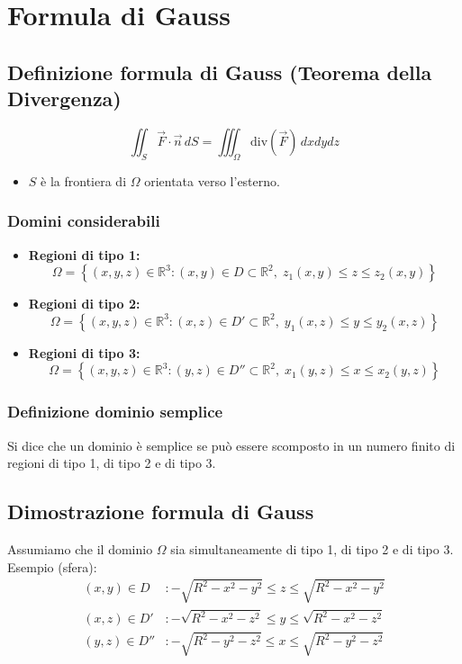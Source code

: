 \chapter{Formula di Gauss}

\section{Definizione formula di Gauss (Teorema della Divergenza)}

\[
\iint_{S} \vec{F} \cdot \vec{n} \, dS = \iiint_{\Omega} \text{div}(\vec{F}) \, dx dy dz
\]

\begin{itemize}
    \item $S$ è la frontiera di $\Omega$ orientata verso l'esterno.
\end{itemize}

\subsection{Domini considerabili}

\begin{itemize}
    \item \textbf{Regioni di tipo 1:}
    \[
    \Omega = \left\{ (x,y,z) \in \mathbb{R}^3 : (x,y) \in D \subset \mathbb{R}^2, \; z_1(x,y) \le z \le z_2(x,y) \right\}
    \]
    \item \textbf{Regioni di tipo 2:}
    \[
    \Omega = \left\{ (x,y,z) \in \mathbb{R}^3 : (x,z) \in D' \subset \mathbb{R}^2, \; y_1(x,z) \le y \le y_2(x,z) \right\}
    \]
    \item \textbf{Regioni di tipo 3:}
    \[
    \Omega = \left\{ (x,y,z) \in \mathbb{R}^3 : (y,z) \in D'' \subset \mathbb{R}^2, \; x_1(y,z) \le x \le x_2(y,z) \right\}
    \] 
\end{itemize}

\subsection{Definizione dominio semplice}
Si dice che un dominio è semplice se può essere scomposto in un numero finito di regioni di tipo 1, di tipo 2 e di tipo 3.

\section{Dimostrazione formula di Gauss}

Assumiamo che il dominio $\Omega$ sia simultaneamente di tipo 1, di tipo 2 e di tipo 3. 
Esempio (sfera):
\begin{align*}
(x,y) \in D &: -\sqrt{R^2-x^2-y^2} \le z \le \sqrt{R^2-x^2-y^2} \\
(x,z) \in D' &: -\sqrt{R^2-x^2-z^2} \le y \le \sqrt{R^2-x^2-z^2} \\
(y,z) \in D'' &: -\sqrt{R^2-y^2-z^2} \le x \le \sqrt{R^2-y^2-z^2}
\end{align*}

